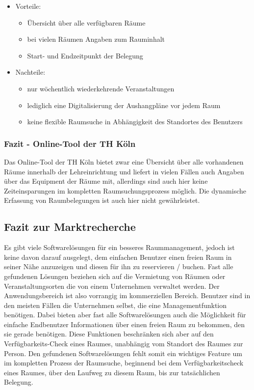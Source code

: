\begin{itemize}
	\item Vorteile:
		\begin{itemize}
			\item Übersicht über alle verfügbaren Räume
			\item bei vielen Räumen Angaben zum Rauminhalt
			\item Start- und Endzeitpunkt der Belegung
		\end{itemize}
	\item Nachteile:
		\begin{itemize}
			\item nur wöchentlich wiederkehrende Veranstaltungen
			\item lediglich eine Digitalisierung der Aushangpläne vor jedem Raum
			\item keine flexible Raumsuche in Abhängigkeit des Standortes des Benutzers
		\end{itemize}
\end{itemize}

\subsubsection{Fazit - Online-Tool der TH Köln}
\label{sec:Fazit - Online-Tool der TH Köln}

Das Online-Tool der TH Köln bietet zwar eine Übersicht über alle vorhandenen
Räume innerhalb der Lehreinrichtung und liefert in vielen Fällen auch Angaben
über das Equipment der Räume mit, allerdings sind auch hier keine
Zeiteinsparungen im kompletten Raumsuchungsprozess möglich. Die dynamische
Erfassung von Raumbelegungen ist auch hier nicht gewährleistet.


\subsection{Fazit zur Marktrecherche}
\label{sec:Fazit zur Marktrecherche}

Es gibt viele Softwarelösungen für ein besseres Raummanagement, jedoch ist
keine davon darauf ausgelegt, dem einfachen Benutzer einen freien Raum in
seiner Nähe anzuzeigen und diesen für ihn zu reservieren / buchen. Fast alle
gefundenen Lösungen beziehen sich auf die Vermietung von Räumen oder
Veranstaltungsorten die von einem Unternehmen verwaltet werden.
Der Anwendungsbereich ist also vorrangig im kommerziellen Bereich. Benutzer
sind in den meisten Fällen die Unternehmen selbst, die eine Managementfunktion
benötigen. Dabei bieten aber fast alle Softwarelösungen auch die Möglichkeit
für einfache Endbenutzer Informationen über einen freien Raum zu bekommen,
den sie gerade benötigen. Diese Funktionen beschränken sich aber auf den
Verfügbarkeits-Check eines Raumes, unabhängig vom Standort des Raumes zur
Person. Den gefundenen Softwarelösungen fehlt somit ein wichtiges Feature um im
kompletten Prozess der Raumsuche, beginnend bei dem Verfügbarkeitscheck eines
Raumes, über den Laufweg zu diesem Raum, bis zur tatsächlichen Belegung.


